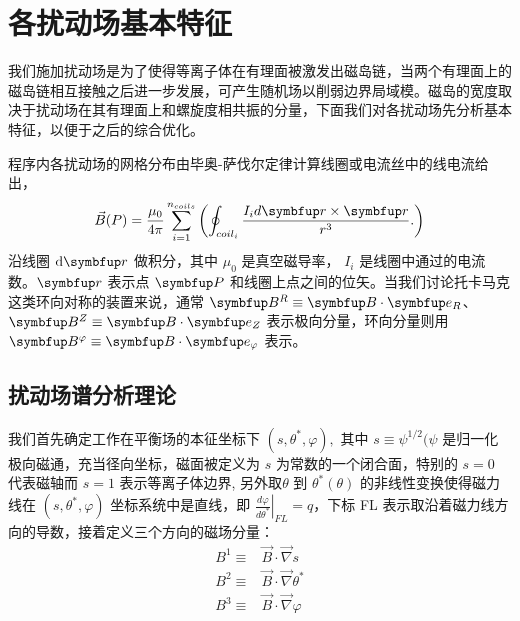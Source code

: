 \chapter{各扰动场基本特征}

我们施加扰动场是为了使得等离子体在有理面被激发出磁岛链，当两个有理面上的磁岛链相互接触之后进一步发展，可产生随机场以削弱边界局域模。磁岛的宽度取决于扰动场在其有理面上和螺旋度相共振的分量，下面我们对各扰动场先分析基本特征，以便于之后的综合优化。

程序内各扰动场的网格分布由毕奥-萨伐尔定律计算线圈或电流丝中的线电流给出，
\begin{equation}\vec{B}(P)=\frac{\mu_{0}}{4 \pi} \sum_{i=1}^{n_{coils}}\left(\oint_{c o i l_{i}} \frac{I_{i} d \vect{r} \times \vect{r}}{r^{3}}.\right)\end{equation}
沿线圈 $\mathrm{d} \vect{r}$ 做积分，其中 $\mu_0$ 是真空磁导率， $I_i$ 是线圈中通过的电流数。$\vect{r}$ 表示点 $\vect{P}$ 和线圈上点之间的位矢。当我们讨论托卡马克这类环向对称的装置来说，通常 $\vect{B}^R\equiv \vect{B}\cdot \vect{e}_R$、$\vect{B}^Z\equiv \vect{B}\cdot \vect{e}_Z$ 表示极向分量，环向分量则用 $\vect{B}^\varphi \equiv \vect{B}\cdot \vect{e}_\varphi$ 表示。


\section{扰动场谱分析理论}
我们首先确定工作在平衡场的本征坐标下 $\left(s, \theta^{*}, \varphi\right),$ 其中 $s \equiv \psi^{1 / 2}(\psi$ 是归一化极向磁通，充当径向坐标，磁面被定义为 $s$ 为常数的一个闭合面，特别的 $s=0$ 代表磁轴而 $s=1$ 表示等离子体边界, 另外取$\theta$ 到 $\theta^{*}(\theta)$ 的非线性变换使得磁力线在 $\left(s, \theta^{*}, \varphi\right)$ 坐标系统中是直线，即 $\left.\frac{d \varphi}{d \theta^{*}}\right|_{F L}=q$，下标 FL 表示取沿着磁力线方向的导数，接着定义三个方向的磁场分量：
\begin{equation}
  \begin{aligned}
B^{1} \equiv & \vec{B} \cdot \vec{\nabla} s \\
B^{2} \equiv & \vec{B} \cdot \vec{\nabla} \theta^{*} \\
B^{3} \equiv & \vec{B} \cdot \vec{\nabla} \varphi\\
  \end{aligned}
\label{de:B-comp}
\end{equation}

